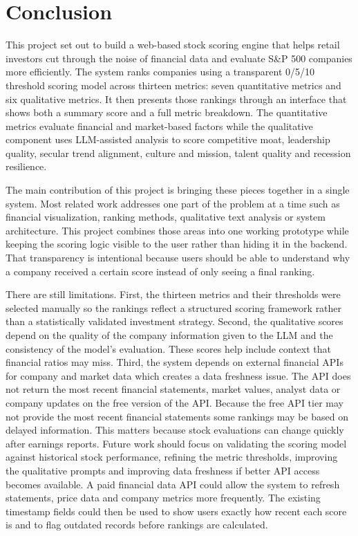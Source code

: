 \documentclass[12pt]{article}
\begin{document}
\section{Conclusion}
This project set out to build a web-based stock scoring engine that helps retail investors cut through the noise of financial data and evaluate S\&P 500 companies more efficiently. The system ranks companies using a transparent 0/5/10 threshold scoring model across thirteen metrics: seven quantitative metrics and six qualitative metrics. It then presents those rankings through an interface that shows both a summary score and a full metric breakdown. The quantitative metrics evaluate financial and market-based factors while the qualitative component uses LLM-assisted analysis to score competitive moat, leadership quality, secular trend alignment, culture and mission, talent quality and recession resilience.

The main contribution of this project is bringing these pieces together in a single system. Most related work addresses one part of the problem at a time such as financial visualization, ranking methods, qualitative text analysis or system architecture. This project combines those areas into one working prototype while keeping the scoring logic visible to the user rather than hiding it in the backend. That transparency is intentional because users should be able to understand why a company received a certain score instead of only seeing a final ranking.

There are still limitations. First, the thirteen metrics and their thresholds were selected manually so the rankings reflect a structured scoring framework rather than a statistically validated investment strategy. Second, the qualitative scores depend on the quality of the company information given to the LLM and the consistency of the model's evaluation. These scores help include context that financial ratios may miss. Third, the system depends on external financial APIs for company and market data which creates a data freshness issue. The API does not return the most recent financial statements, market values, analyst data or company updates on the free version of the API. Because the free API tier may not provide the most recent financial statements some rankings may be based on delayed information. This matters because stock evaluations can change quickly after earnings reports.
Future work should focus on validating the scoring model against historical stock performance, refining the metric thresholds, improving the qualitative prompts and improving data freshness if better API access becomes available. A paid financial data API could allow the system to refresh statements, price data and company metrics more frequently. The existing timestamp fields could then be used to show users exactly how recent each score is and to flag outdated records before rankings are calculated.
\end{document}
